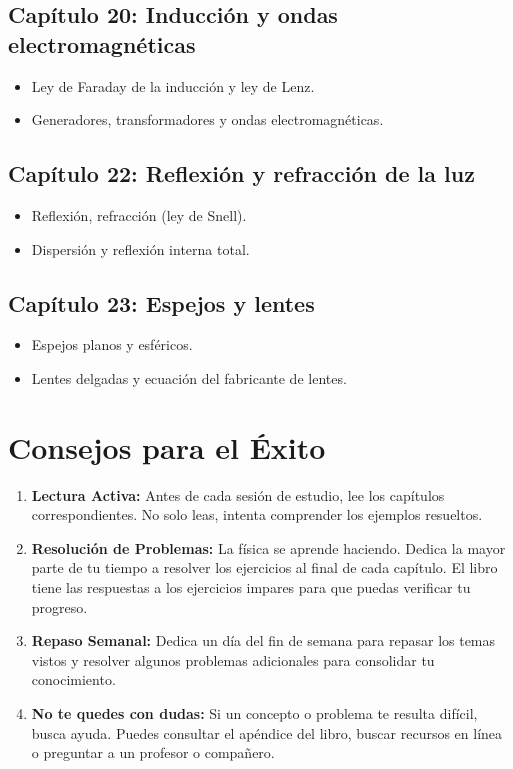 \documentclass[12pt, a4paper]{article}
\begin{document}
\subsection*{Capítulo 20: Inducción y ondas electromagnéticas}
\begin{itemize}[leftmargin=*]
    \item Ley de Faraday de la inducción y ley de Lenz.
    \item Generadores, transformadores y ondas electromagnéticas.
\end{itemize}
\subsection*{Capítulo 22: Reflexión y refracción de la luz}
\begin{itemize}[leftmargin=*]
    \item Reflexión, refracción (ley de Snell).
    \item Dispersión y reflexión interna total.
\end{itemize}
\subsection*{Capítulo 23: Espejos y lentes}
\begin{itemize}[leftmargin=*]
    \item Espejos planos y esféricos.
    \item Lentes delgadas y ecuación del fabricante de lentes.
\end{itemize}

\newpage

\section*{Consejos para el Éxito}
\begin{enumerate}[leftmargin=*]
    \item \textbf{Lectura Activa:} Antes de cada sesión de estudio, lee los capítulos correspondientes. No solo leas, intenta comprender los ejemplos resueltos.
    \item \textbf{Resolución de Problemas:} La física se aprende haciendo. Dedica la mayor parte de tu tiempo a resolver los ejercicios al final de cada capítulo. El libro tiene las respuestas a los ejercicios impares para que puedas verificar tu progreso.
    \item \textbf{Repaso Semanal:} Dedica un día del fin de semana para repasar los temas vistos y resolver algunos problemas adicionales para consolidar tu conocimiento.
    \item \textbf{No te quedes con dudas:} Si un concepto o problema te resulta difícil, busca ayuda. Puedes consultar el apéndice del libro, buscar recursos en línea o preguntar a un profesor o compañero.
\end{enumerate}
\end{document}

